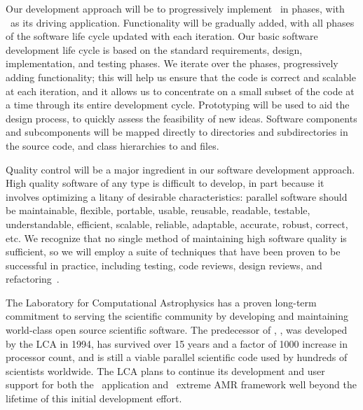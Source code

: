 \documentclass[11pt,letterpaper]{article}
\begin{document}
Our development approach will be to progressively implement \cello\ in
phases, with \enzoii\ as its driving application.  Functionality will
be gradually added, with all phases of the software life cycle updated
with each iteration.  
%
Our basic software development life cycle is based on the standard
requirements, design, implementation, and testing phases.  We iterate
over the phases, progressively adding functionality; this will help
us ensure that the code is correct and scalable at each iteration, and it
allows us to concentrate on a small subset of the code at a time
through its entire development cycle.  
%
Prototyping will be used to aid the design
process, to quickly assess the feasibility of new ideas.  Software
components and subcomponents will be mapped directly to directories and 
subdirectories in the source code, and class
hierarchies to  and  files.


 Quality control will be a major ingredient 
in our software development
approach.  High quality software of any type is difficult to develop,
in part because it involves optimizing a litany of desirable
characteristics: parallel software should be maintainable, flexible,
portable, usable, reusable, readable, testable, understandable,
efficient, scalable, reliable, adaptable, accurate, robust, correct,
etc.  We recognize that no single method of maintaining high software
quality is sufficient, so we will employ a suite of techniques that
have been proven to be successful in practice, including testing, code
reviews, design reviews, and refactoring~\cite{Mc04}.

 The Laboratory for Computational
Astrophysics has a proven long-term commitment to serving the
scientific community by developing and maintaining world-class open
source scientific software.
%
The predecessor of \enzoii, \enzo, was developed by the LCA in 1994,
has survived over 15 years and a factor of 1000 increase in processor
count, and is still a viable parallel scientific code used by hundreds
of scientists worldwide.
%
The LCA plans to continue its development and user support for both
the \enzoii\ application and \cello\ extreme AMR framework well beyond
the lifetime of this initial
development effort.
\end{document}
